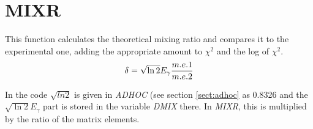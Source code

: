 \section{MIXR}
\label{sect:mixr}

\noindent This function calculates the theoretical mixing ratio and compares
it to the experimental one, adding the appropriate amount to $\chi^2$ and
the log of $\chi^2$.\\

\begin{equation}
\delta = \sqrt{\ln 2} E_\gamma {m.e. 1 \over m.e. 2}
\end{equation}

\noindent In the code $\sqrt{ln 2}$ is given in {\em ADHOC} (see section
\ref{sect:adhoc} as 0.8326 and the $\sqrt{\ln 2} E_\gamma$ part is stored in
the variable {\em DMIX} there. In {\em MIXR}, this is multiplied by the
ratio of the matrix elements.\\


